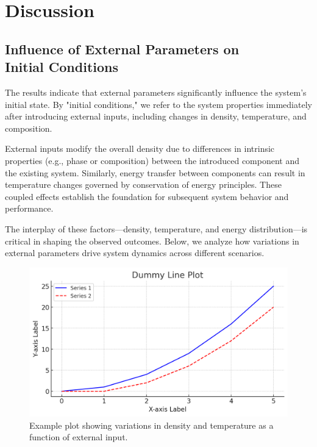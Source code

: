 \chapter{Discussion}

\fancyfoot[C]{\thepage}

\section{Influence of External Parameters on\\ Initial Conditions}
The results indicate that external parameters significantly influence the system's initial state. 
By "initial conditions," we refer to the system properties immediately after introducing external inputs, including changes in density, temperature, and composition.

External inputs modify the overall density due to differences in intrinsic properties (e.g., phase or composition) between the introduced component and the existing system. Similarly, energy transfer between components can result in temperature changes governed by conservation of energy principles. These coupled effects establish the foundation for subsequent system behavior and performance.

The interplay of these factors—density, temperature, and energy distribution—is critical in shaping the observed outcomes. Below, we analyze how variations in external parameters drive system dynamics across different scenarios.

\begin{figure}[h!]
    \centering
    \includegraphics[width=130mm,scale=0.6]{body/images/placeholder_image1.png}
    \caption[System Properties at Initial State]{Example plot showing variations in density and temperature as a function of external input.}
    \label{fig:initial_conditions}
\end{figure}

